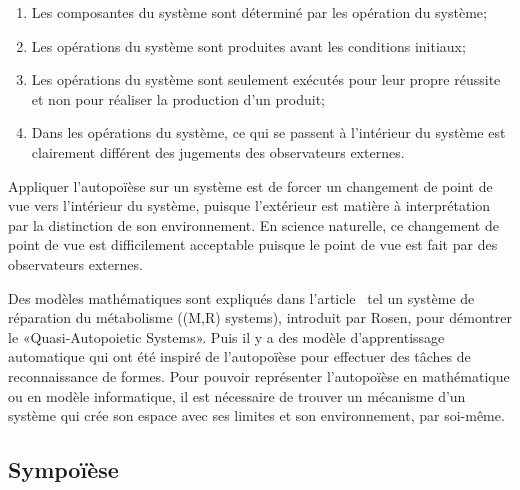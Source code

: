 \begin{enumerate}
    \item Les composantes du système sont déterminé par les opération du système;
    \item Les opérations du système sont produites avant les conditions initiaux;
    \item Les opérations du système sont seulement exécutés pour leur propre réussite et non pour réaliser la production d'un produit;
    \item Dans les opérations du système, ce qui se passent à l'intérieur du système est clairement différent des jugements des observateurs externes.
\end{enumerate}



Appliquer l'autopoïèse sur un système est de forcer un changement de point de vue vers l'intérieur du système, puisque l'extérieur est matière à interprétation par la distinction de son environnement. En science naturelle, ce changement de point de vue est difficilement acceptable puisque le point de vue est fait par des observateurs externes.

Des modèles mathématiques sont expliqués dans l'article~\cite{tatsuya_computational_autopoiesis_2000} tel un système de réparation du métabolisme ((M,R) systems), introduit par Rosen, pour démontrer le «Quasi-Autopoietic Systems».
Puis il y a des modèle d'apprentissage automatique qui ont été inspiré de l'autopoïèse pour effectuer des tâches de reconnaissance de formes. Pour pouvoir représenter l'autopoïèse en mathématique ou en modèle informatique, il est nécessaire de trouver un mécanisme d'un système qui crée son espace avec ses limites et son environnement, par soi-même.


\subsection{Sympoïèse}

